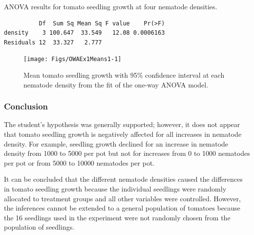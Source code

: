 \documentclass[10pt,openany]{book}\usepackage[]{graphicx}\usepackage[]{color}
\makeatletter
\newenvironment{kframe}{%
 \def\at@end@of@kframe{}%
 \ifinner\ifhmode%
  \def\at@end@of@kframe{\end{minipage}}%
  \begin{minipage}{\columnwidth}%
 \fi\fi%
 \def\FrameCommand##1{\hskip\@totalleftmargin \hskip-\fboxsep
 \colorbox{shadecolor}{##1}\hskip-\fboxsep
     \hskip-\linewidth \hskip-\@totalleftmargin \hskip\columnwidth}%
 \MakeFramed {\advance\hsize-\width
   \@totalleftmargin\z@ \linewidth\hsize
   \@setminipage}}%
 {\par\unskip\endMakeFramed%
 \at@end@of@kframe}
\newenvironment{knitrout}{}{} %
\makeatother
\begin{document}
\begin{table}[h]
  \centering
  \caption{ANOVA results for tomato seedling growth at four nematode densities.}\label{tab:OWAEx1ANOVA}
\begin{knitrout}
\color{fgcolor}\begin{kframe}
\begin{verbatim}
          Df  Sum Sq Mean Sq F value    Pr(>F)
density    3 100.647  33.549   12.08 0.0006163
Residuals 12  33.327   2.777                  
\end{verbatim}
\end{kframe}
\end{knitrout}
\end{table}

\begin{knitrout}
\color{fgcolor}\begin{figure}[hbtp]

{\centering \texttt{[image: Figs/OWAEx1Means1-1]} 

}

\caption[Mean tomato seedling growth with 95\% confidence interval at each nematode density from the fit of the one-way ANOVA model]{Mean tomato seedling growth with 95\% confidence interval at each nematode density from the fit of the one-way ANOVA model.}\label{fig:OWAEx1Means1}
\end{figure}


\end{knitrout}

\subsubsection*{Conclusion}
The student's hypothesis was generally supported; however, it does not appear that tomato seedling growth is negatively affected for all increases in nematode density.  For example, seedling growth declined for an increase in nematode density from 1000 to 5000 per pot but not for increases from 0 to 1000 nematodes per pot or from 5000 to 10000 nematodes per pot.

It can be concluded that the different nematode densities caused the differences in tomato seedling growth because the individual seedlings were randomly allocated to treatment groups and all other variables were controlled.  However, the inferences cannot be extended to a general population of tomatoes because the 16 seedlings used in the experiment were not randomly chosen from the population of seedlings.
\end{document}
